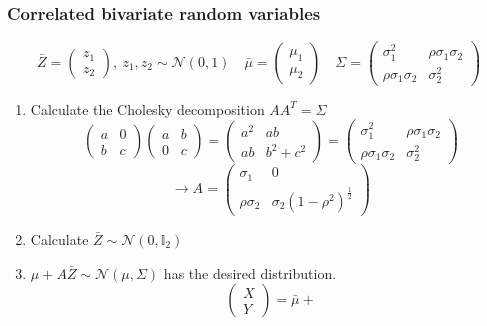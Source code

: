 \documentclass[10pt, serif, mathserif]{beamer}
\begin{document}
\begin{frame}
  \frametitle{Correlated bivariate random variables}
  \[
    \bar{Z} = \left(\begin{matrix} z_1 \\ z_2 \end{matrix} \right), \ z_1, z_2 \sim \mathcal{N}(0,1)
    \quad
    \bar{\mu} = \left(\begin{matrix} \mu_1 \\ \mu_2 \end{matrix} \right)
    \quad
    \Sigma = \left(\begin{matrix} \sigma_1^2 & \rho\sigma_1\sigma_2 \\ \rho\sigma_1\sigma_2 & \sigma_2^2 \end{matrix} \right)
  \]
  \begin{enumerate}
    \item Calculate the Cholesky decomposition $AA^T = \Sigma$
      \[
        \left(\begin{matrix} a & 0 \\ b & c \end{matrix} \right)
        \left(\begin{matrix} a & b \\ 0 & c \end{matrix} \right) =
        \left(\begin{matrix} a^2 & ab \\ ab & b^2 + c^2 \end{matrix} \right)
        = \left(\begin{matrix} \sigma_1^2 & \rho\sigma_1\sigma_2 \\ \rho\sigma_1\sigma_2 & \sigma_2^2 \end{matrix} \right)
      \] \[
        \rightarrow A = \left(\begin{matrix} \sigma_1 & 0 \\ \rho\sigma_2 & \sigma_2(1-\rho^2)^{\frac{1}{2}} \end{matrix} \right)
      \]
    \item Calculate $\bar{Z} \sim\mathcal{N}(0,\mathbb{I}_2)$
    \item $\mu + A\bar{Z} \sim \mathcal{N}(\mu,\Sigma)$ has the desired distribution.
      \[
        \left( \begin{matrix}X \\ Y \end{matrix} \right) = 
        \bar{\mu} + %
\]
\end{enumerate}
\end{frame}
\end{document}

